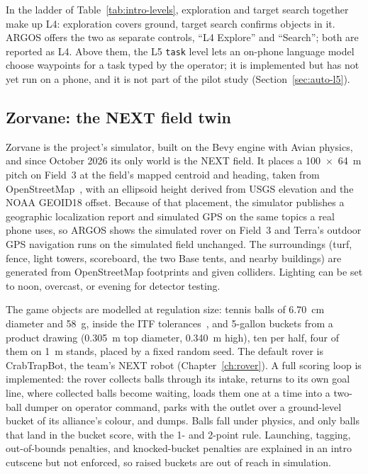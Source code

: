 In the ladder of Table~\ref{tab:intro-levels}, exploration and target search together make up L4: exploration covers ground, target search confirms objects in it.
ARGOS offers the two as separate controls, ``L4 Explore'' and ``Search''; both are reported as L4.
Above them, the L5 \texttt{task} level lets an on-phone language model choose waypoints for a task typed by the operator; it is implemented but has not yet run on a phone, and it is not part of the pilot study (Section~\ref{sec:auto-l5}).

\subsection{Zorvane: the NEXT field twin}
\label{sec:env-zorvane}

Zorvane is the project's simulator, built on the Bevy engine with Avian physics, and since October 2026 its only world is the NEXT field.
It places a 100~$\times$~64~m pitch on Field~3 at the field's mapped centroid and heading, taken from OpenStreetMap~\citep{osm2026field3}, with an ellipsoid height derived from USGS elevation and the NOAA GEOID18 offset.
Because of that placement, the simulator publishes a geographic localization report and simulated GPS on the same topics a real phone uses, so ARGOS shows the simulated rover on Field~3 and Terra's outdoor GPS navigation runs on the simulated field unchanged.
The surroundings (turf, fence, light towers, scoreboard, the two Base tents, and nearby buildings) are generated from OpenStreetMap footprints and given colliders.
Lighting can be set to noon, overcast, or evening for detector testing.

The game objects are modelled at regulation size: tennis balls of 6.70~cm diameter and 58~g, inside the ITF tolerances~\citep{itf2026rules}, and 5-gallon buckets from a product drawing (0.305~m top diameter, 0.340~m high), ten per half, four of them on 1~m stands, placed by a fixed random seed.
The default rover is CrabTrapBot, the team's NEXT robot (Chapter~\ref{ch:rover}).
A full scoring loop is implemented: the rover collects balls through its intake, returns to its own goal line, where collected balls become waiting, loads them one at a time into a two-ball dumper on operator command, parks with the outlet over a ground-level bucket of its alliance's colour, and dumps.
Balls fall under physics, and only balls that land in the bucket score, with the 1- and 2-point rule.
Launching, tagging, out-of-bounds penalties, and knocked-bucket penalties are explained in an intro cutscene but not enforced, so raised buckets are out of reach in simulation.


